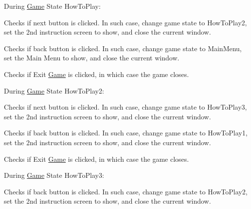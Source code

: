 \begin{DoxyItemize}
\begin{DoxyEnumerate}
\end{DoxyEnumerate}
\item During \hyperlink{class_controller_1_1_game}{Game} State How\+To\+Play\+: ~\newline

\begin{DoxyEnumerate}
\item Checks if next button is clicked. In such case, change game state to How\+To\+Play2, set the 2nd instruction screen to show, and close the current window. ~\newline

\item Checks if back button is clicked. In such case, change game state to Main\+Menu, set the Main Menu to show, and close the current window. ~\newline

\item Checks if Exit \hyperlink{class_controller_1_1_game}{Game} is clicked, in which case the game closes. ~\newline

\end{DoxyEnumerate}
\item During \hyperlink{class_controller_1_1_game}{Game} State How\+To\+Play2\+: ~\newline

\begin{DoxyEnumerate}
\item Checks if next button is clicked. In such case, change game state to How\+To\+Play3, set the 2nd instruction screen to show, and close the current window. ~\newline

\item Checks if back button is clicked. In such case, change game state to How\+To\+Play1, set the 2nd instruction screen to show, and close the current window. ~\newline

\item Checks if Exit \hyperlink{class_controller_1_1_game}{Game} is clicked, in which case the game closes. ~\newline

\end{DoxyEnumerate}
\item During \hyperlink{class_controller_1_1_game}{Game} State How\+To\+Play3\+: ~\newline

\begin{DoxyEnumerate}
\item Checks if back button is clicked. In such case, change game state to How\+To\+Play2, set the 2nd instruction screen to show, and close the current window. ~\newline


\end{DoxyEnumerate}
\end{DoxyItemize}
